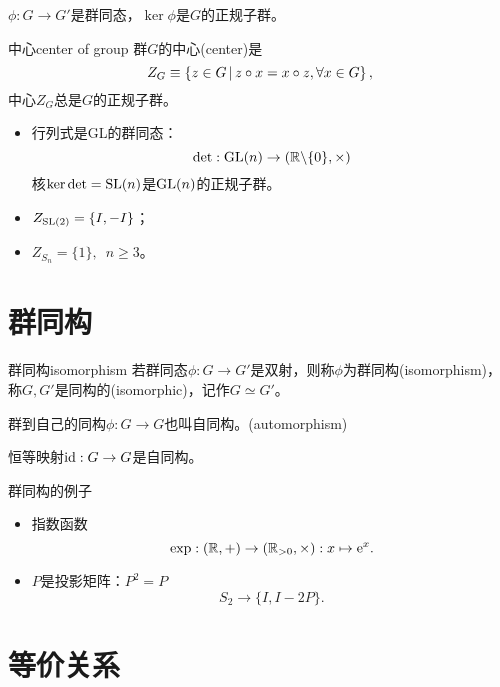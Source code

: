 \begin{theorem}{}{}
	$\phi:G\to G'$是群同态，$\ker\phi$是$G$的正规子群。
\end{theorem}
\begin{definition}{中心}{center of group}
	群$G$的中心(center)是
	\begin{equation}
		Z_G\equiv\left\{z\in G\,\middle\vert\,z\circ x=x\circ z,\forall x\in G\right\},
	\end{equation}
	中心$Z_G$总是$G$的正规子群。
\end{definition}
\begin{example}{}{}
	\begin{itemize}
		\item 行列式是GL的群同态：
		\[
			\det:\operatorname{GL}(n)\to(\mathbb R\backslash\{0\},\times)
		\]
		核$\ker\det=\operatorname{SL}(n)$是$\operatorname{GL}(n)$的正规子群。
		\item $Z_{\operatorname{SL}(2)}=\{I,-I\}$；
		\item $Z_{S_n}=\{1\},\enspace n\geq 3$。
	\end{itemize}
\end{example}

\section{群同构}

\begin{definition}{群同构}{isomorphism}
	若群同态$\phi:G\to G'$是双射，则称$\phi$为群同构(isomorphism)，称$G,G'$是同构的(isomorphic)，记作$G\simeq G'$。
	
	群到自己的同构$\phi:G\to G$也叫自同构。(automorphism)
\end{definition}
恒等映射$\operatorname{id}:G\to G$是自同构。
\begin{example}{群同构的例子}{}
	\begin{itemize}
		\item 指数函数
		\[
			\exp:(\mathbb R,+)\to(\mathbb R_{>0},\times):x\mapsto\mathop{}\!\mathrm{e}^ x.
		\]
		\item $P$是投影矩阵：$P^2=P$
		\[
			S_2\to\{I,I-2P\}.
		\]
	\end{itemize}
\end{example}

\section{等价关系}

